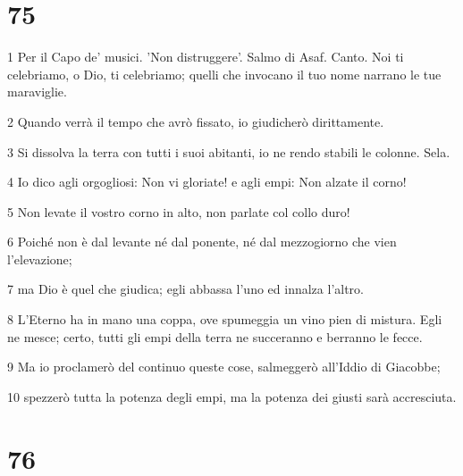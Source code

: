 \chapter{75}

\par 1 Per il Capo de' musici. 'Non distruggere'. Salmo di Asaf. Canto. Noi ti celebriamo, o Dio, ti celebriamo; quelli che invocano il tuo nome narrano le tue maraviglie.
\par 2 Quando verrà il tempo che avrò fissato, io giudicherò dirittamente.
\par 3 Si dissolva la terra con tutti i suoi abitanti, io ne rendo stabili le colonne. Sela.
\par 4 Io dico agli orgogliosi: Non vi gloriate! e agli empi: Non alzate il corno!
\par 5 Non levate il vostro corno in alto, non parlate col collo duro!
\par 6 Poiché non è dal levante né dal ponente, né dal mezzogiorno che vien l'elevazione;
\par 7 ma Dio è quel che giudica; egli abbassa l'uno ed innalza l'altro.
\par 8 L'Eterno ha in mano una coppa, ove spumeggia un vino pien di mistura. Egli ne mesce; certo, tutti gli empi della terra ne succeranno e berranno le fecce.
\par 9 Ma io proclamerò del continuo queste cose, salmeggerò all'Iddio di Giacobbe;
\par 10 spezzerò tutta la potenza degli empi, ma la potenza dei giusti sarà accresciuta.

\chapter{76}

